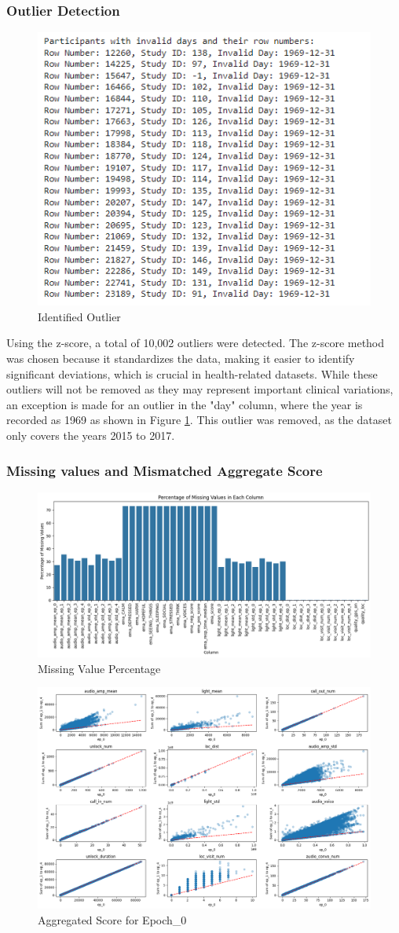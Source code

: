 \subsubsection{Outlier Detection}




\begin{figure}[H]
    \centering
    \includegraphics[width=0.5\linewidth]{Dissertation 24/correlation.png}
    \caption{Identified Outlier}
    \label{outler2}
\end{figure}
Using the z-score, a total of 10,002 outliers were detected. The z-score method was chosen because it standardizes the data, making it easier to identify significant deviations, which is crucial in health-related datasets. While these outliers will not be removed as they may represent important clinical variations, an exception is made for an outlier in the "day" column, where the year is recorded as 1969 as shown in Figure \ref{outler2}. This outlier was removed, as the dataset only covers the years 2015 to 2017.

\subsubsection{Missing values and Mismatched Aggregate Score}

\begin{figure}[H]
    \centering
    \includegraphics[width=0.5\linewidth]{Dissertation 24/missing values.png}
    \caption{Missing Value Percentage}
    \label{miss}
\end{figure}


\begin{figure}[H]
    \centering
    \includegraphics[width=0.5\linewidth]{Dissertation 24/ep_0.png}
    \caption{Aggregated Score for Epoch_0}
    \label{aggr}
\end{figure}

